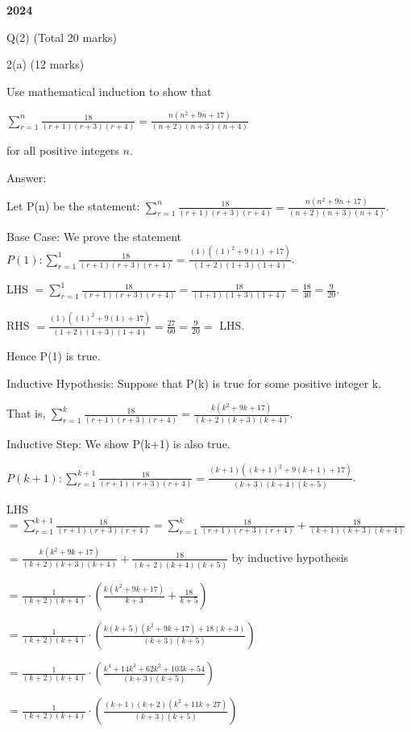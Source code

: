 \documentclass[a4paper,12pt,oneside]{book}
\theoremstyle{definition}
\begin{document}
\raggedbottom
\thispagestyle{fancy}

\newpage

{\bf 2024}


\newpage

Q(2) (Total 20 marks)

2(a) (12 marks)

Use mathematical induction to show that

$\sum_{r=1}^n \frac{18}{(r+1)(r+3)(r+4)} = \frac{n(n^2+9n+17)}{(n+2)(n+3)(n+4)}$

for all positive integers $n$.

Answer:

Let P(n) be the statement: $\sum_{r=1}^n \frac{18}{(r+1)(r+3)(r+4)} = \frac{n(n^2+9n+17)}{(n+2)(n+3)(n+4)}$.

Base Case: We prove the statement $P(1) : \sum_{r=1}^1 \frac{18}{(r+1)(r+3)(r+4)} = \frac{(1)((1)^2+9(1)+17)}{(1+2)(1+3)(1+4)}$.

LHS $ = \sum_{r=1}^1 \frac{18}{(r+1)(r+3)(r+4)} = \frac{18}{(1+1)(1+3)(1+4)} = \frac{18}{40} = \frac{9}{20}$.

RHS $ = \frac{(1)((1)^2+9(1)+17)}{(1+2)(1+3)(1+4)} = \frac{27}{60} = \frac{9}{20} = $ LHS.

Hence P(1) is true.

Inductive Hypothesis: Suppose that P(k) is true for some positive integer k.

That is, $\sum_{r=1}^k \frac{18}{(r+1)(r+3)(r+4)} = \frac{k(k^2+9k+17)}{(k+2)(k+3)(k+4)}$.

Inductive Step: We show P(k+1)  is also true.

$P(k+1) : \sum_{r=1}^{k+1} \frac{18}{(r+1)(r+3)(r+4)} = \frac{(k+1)((k+1)^2+9(k+1)+17)}{(k+3)(k+4)(k+5)}$.

LHS $ =  \sum_{r=1}^{k+1} \frac{18}{(r+1)(r+3)(r+4)} = \sum_{r=1}^{k}\frac{18}{(r+1)(r+3)(r+4)} + \frac{18}{(k+1)(k+3)(k+4)}$

$= \frac{k(k^2+9k+17)}{(k+2)(k+3)(k+4)} + \frac{18}{(k+2)(k+4)(k+5)}$ by inductive hypothesis

$= \frac{1}{(k+2)(k+4)} \cdot \left( \frac{k(k^2+9k+17)}{k+3} + \frac{18}{k+5} \right)$

$= \frac{1}{(k+2)(k+4)} \cdot \left( \frac{k(k+5)(k^2+9k+17)+18(k+3)}{(k+3)(k+5)} \right)$

$= \frac{1}{(k+2)(k+4)} \cdot \left( \frac{k^4+14k^3+62k^2+103k+54}{(k+3)(k+5)} \right)$

$= \frac{1}{(k+2)(k+4)} \cdot \left( \frac{(k+1)(k+2)(k^2+11k+27)}{(k+3)(k+5)} \right)$
\end{document}
